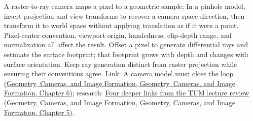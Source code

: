A raster-to-ray camera maps a pixel to a geometric sample; In a pinhole model, invert projection and view transforms to recover a camera-space direction, then transform it to world space without applying translation as if it were a point. Pixel-center convention, viewport origin, handedness, clip-depth range, and normalization all affect the result. Offset a pixel to generate differential rays and estimate the surface footprint; that footprint grows with depth and changes with surface orientation. Keep ray generation distinct from raster projection while ensuring their conventions agree. Link: \href{../03-Geometry-Cameras-and-Image-Formation/main.pdf\#nameddest=02-foundations-ii-ch037-a-camera-model-must-close-the-loop}{A camera model must close the loop (Geometry, Cameras, and Image Formation, Geometry, Cameras, and Image Formation, Chapter 6)}; research: \href{../03-Geometry-Cameras-and-Image-Formation/main.pdf\#nameddest=02-foundations-ii-ch036-four-deeper-links-from-the-tum-lecture-review}{Four deeper links from the TUM lecture review (Geometry, Cameras, and Image Formation, Geometry, Cameras, and Image Formation, Chapter 5)}.
